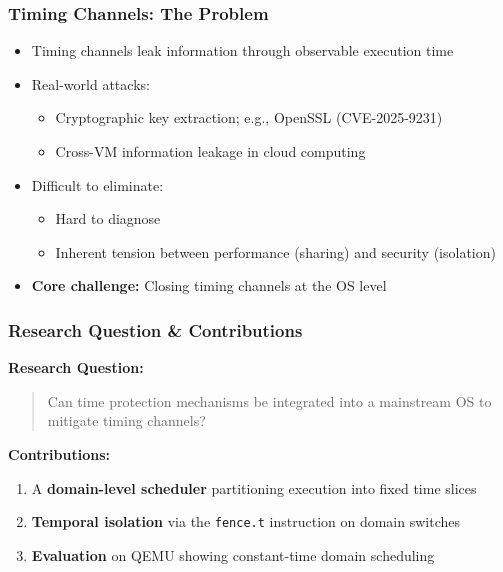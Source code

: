 \begin{frame}
\frametitle{Timing Channels: The Problem}

\begin{itemize}
  \item Timing channels leak information through observable execution time
  \item Real-world attacks:
    \begin{itemize}
      \item Cryptographic key extraction; e.g., OpenSSL (CVE-2025-9231)
      \item Cross-VM information leakage in cloud computing
    \end{itemize}
  \item Difficult to eliminate:
    \begin{itemize}
      \item Hard to diagnose
      \item Inherent tension between performance (sharing) and security (isolation)
    \end{itemize}
  \item \textbf{Core challenge:} Closing timing channels at the OS level
\end{itemize}

\tiny{}

\end{frame}

\begin{frame}
\frametitle{Research Question \& Contributions}

\textbf{Research Question:}
\begin{quote}
Can time protection mechanisms be integrated into a mainstream OS to mitigate timing channels?
\end{quote}

\vspace{0.5cm}
\textbf{Contributions:}
\begin{enumerate}
  \item A \textbf{domain-level scheduler} partitioning execution into fixed time slices
  \item \textbf{Temporal isolation} via the \texttt{fence.t} instruction on domain switches
  \item \textbf{Evaluation} on QEMU showing constant-time domain scheduling
\end{enumerate}

\end{frame}
